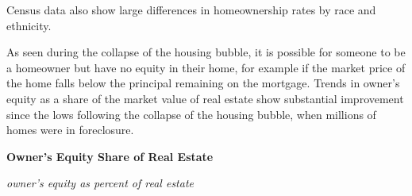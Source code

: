 \documentclass{report}
\makeatletter
\newcommand*\short[1]{\expandafter\@gobbletwo\number\numexpr#1\relax}
\newcommand{\shdateaxisticks}{
		date coordinates in=x, axis line style={draw=none},
		xmax={2021-01-01},
		max space between ticks=40,	    
		xtick={{1990-01-01}, {1995-01-01}, {2000-01-01}, 
			{2005-01-01}, {2010-01-01}, {2015-01-01}, {2020-01-01}},
		minor xtick={},
		enlarge y limits={0.06}, enlarge x limits={0.01},
		}
\newcommand{\stdline}[4]{\addplot[very thick, no markers, color=#1] 
		table [x=#2, y=#3, col sep=comma] {#4};	}
\newcommand{\rbars}{
		\fill[color=black!10] (axis cs:{1990-07-01},\pgfkeysvalueof{/pgfplots/ymin}) rectangle 
			(axis cs:{1991-03-01}, \pgfkeysvalueof{/pgfplots/ymax});
		\fill[color=black!10] (axis cs:{2007-12-01},\pgfkeysvalueof{/pgfplots/ymin}) rectangle 
			(axis cs:{2009-07-01}, \pgfkeysvalueof{/pgfplots/ymax});
		\fill[color=black!10] (axis cs:{2001-03-01},\pgfkeysvalueof{/pgfplots/ymin}) rectangle 
			(axis cs:{2001-11-01}, \pgfkeysvalueof{/pgfplots/ymax});
		\fill[color=black!10] (axis cs:{2020-02-01},\pgfkeysvalueof{/pgfplots/ymin}) rectangle 
			(axis cs:{2020-09-01}, \pgfkeysvalueof{/pgfplots/ymax});}
\makeatother
\begin{document}
{{{\begin{minipage}{0.405\textwidth}
\end{minipage}\hspace{5.5mm}
\begin{minipage}{0.315\textwidth}
\small Census data also show large differences in homeownership rates by race and ethnicity.  \\


\end{minipage}\hspace{5mm}

\vspace{3mm}

\begin{minipage}{0.76\textwidth}

\small

As seen during the collapse of the housing bubble, it is possible for someone to be a homeowner but have no equity in their home, for example if the market price of the home falls below the principal remaining on the mortgage. Trends in owner's equity as a share of the market value of real estate show substantial improvement since the lows following the collapse of the housing bubble, when millions of homes were in foreclosure. 

\end{minipage}

\vspace{2mm}

\begin{minipage}{0.29\textwidth}

\small 

\end{minipage}\hspace{7mm}
\begin{minipage}{0.46\textwidth}
\normalsize \textbf{Owner's Equity Share of Real Estate}

\footnotesize{\textit{owner's equity as percent of real estate}}

\hspace*{-2mm} 


\end{minipage}}}}
\end{document}
